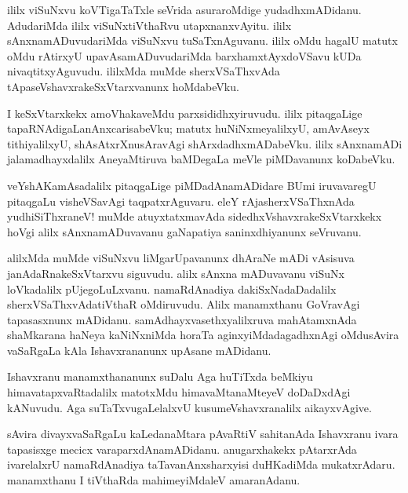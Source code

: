 \documentclass{article}
\begin{document}
\begin{mn}
ililx viSuNxvu koVTigaTaTxle seVrida asuraroMdige yudadhxmADidanu. AdudariMda ililx viSuNxtiVthaRvu
utapxnanxvAyitu. ililx sAnxnamADuvudariMda viSuNxvu tuSaTxnAguvanu. ililx oMdu hagalU matutx oMdu
rAtirxyU upavAsamADuvudariMda barxhamxtAyxdoVSavu kUDa nivaqtitxyAguvudu. ililxMda muMde 
sherxVSaThxvAda tApaseVshavxrakeSxVtarxvanunx hoMdabeVku. 
\end{mn}

\begin{mn}
I keSxVtarxkekx amoVhakaveMdu parxsididhxyiruvudu. ililx pitaqgaLige tapaRNAdigaLanAnxcarisabeVku; 
matutx huNiNxmeyalilxyU, amAvAseyx tithiyalilxyU, shAsAtxrXnusAravAgi shArxdadhxmADabeVku. ililx 
sAnxnamADi jalamadhayxdalilx AneyaMtiruva baMDegaLa meVle piMDavanunx koDabeVku.
\end{mn}

\begin{mn}
veYshAKamAsadalilx pitaqgaLige piMDadAnamADidare BUmi iruvavaregU pitaqgaLu visheVSavAgi 
taqpatxrAguvaru. eleY rAjasherxVSaThxnAda yudhiSiThxraneV! muMde atuyxtatxmavAda 
sidedhxVshavxrakeSxVtarxkekx hoVgi alilx sAnxnamADuvavanu gaNapatiya saninxdhiyanunx seVruvanu.
\end{mn}

\begin{mn}
alilxMda muMde viSuNxvu liMgarUpavanunx dhAraNe mADi vAsisuva janAdaRnakeSxVtarxvu siguvudu. alilx 
sAnxna mADuvavanu viSuNx loVkadalilx pUjegoLuLxvanu. namaRdAnadiya dakiSxNadaDadalilx 
sherxVSaThxvAdatiVthaR oMdiruvudu. Alilx manamxthanu GoVravAgi tapasasxnunx mADidanu. 
samAdhayxvasethxyalilxruva mahAtamxnAda  shaMkarana haNeya kaNiNxniMda horaTa aginxyiMdadagadhxnAgi 
oMdusAvira vaSaRgaLa kAla Ishavxrananunx upAsane mADidanu.
\end{mn}

\begin{mn}
Ishavxranu manamxthananunx suDalu Aga huTiTxda beMkiyu himavatapxvaRtadalilx matotxMdu 
himavaMtanaMteyeV doDaDxdAgi kANuvudu. Aga suTaTxvugaLelalxvU kusumeVshavxranalilx aikayxvAgive.
\end{mn}

\begin{mn}
sAvira divayxvaSaRgaLu kaLedanaMtara pAvaRtiV sahitanAda Ishavxranu ivara tapasisxge mecicx
varaparxdAnamADidanu. anugarxhakekx pAtarxrAda ivarelalxrU namaRdAnadiya taTavanAnxsharxyisi
duHKadiMda mukatxrAdaru. manamxthanu I tiVthaRda mahimeyiMdaleV amaranAdanu.
\end{mn}
\end{document}
